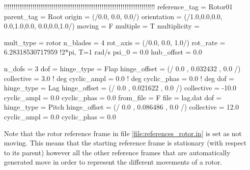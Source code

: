 \begin{inputfile}[frame=single, caption={references\_rotor.in}, label={file:references_rotor.in}]
!!!!!!!!!!!!!!!!!!!!!!!!!!!!!!!!!!!!!!!!!!!!!!!!!!!!!!!!!!!!!!!!!!!!!!!!!!!!!!!
reference_tag = Rotor01
parent_tag = Root
origin = (/0.0, 0.0, 0.0/)
orientation = (/1.0,0.0,0.0, 0.0,1.0,0.0, 0.0,0.0,1.0/)
moving = F
multiple = T
multiplicity = {
  mult_type = rotor
  n_blades = 4
  rot_axis = (/0.0, 0.0, 1.0/)
  rot_rate = 6.28318530717959 !2*pi, T=1 rad/s
  psi_0 = 0.0
  hub_offset = 0.0

  n_dofs = 3
  dof = {
    hinge_type = Flap
    hinge_offset = (/ 0.0 , 0.032432 , 0.0 /)
    collective  =  3.0     ! deg
    cyclic_ampl =  0.0     ! deg
    cyclic_phas =  0.0     ! deg
  }
  dof = {
    hinge_type = Lag
    hinge_offset = (/ 0.0 , 0.021622 , 0.0 /)
    collective  = -10.0
    cyclic_ampl =  0.0
    cyclic_phas =  0.0
    from_file = F 
    file = lag.dat 
  }
  dof = {
    hinge_type = Pitch
    hinge_offset = (/ 0.0 , 0.086486 , 0.0 /)
    collective  = 12.0
    cyclic_ampl =  0.0
    cyclic_phas =  0.0
  }

} 
\end{inputfile}


Note that the rotor reference frame in file \ref{file:references_rotor.in} 
is set as not moving. This means that the starting reference frame is stationary 
(with respect to its parent) however all the other reference frames that are 
automatically generated move in order to represent the different movements of a rotor.

